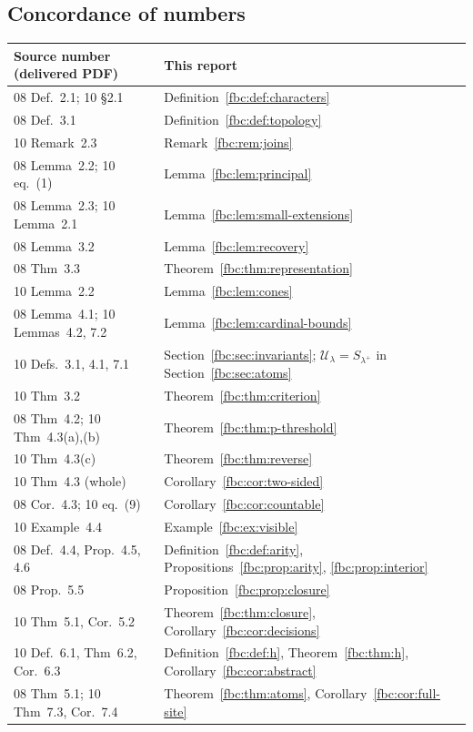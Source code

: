 \documentclass[11pt,letterpaper]{article}
\theoremstyle{definition}
\theoremstyle{remark}
\begin{document}
\subsection{Concordance of numbers}
\label{fbc:app:concordance}
\small
\begin{longtable}{@{}p{}p{}@{}}
\toprule
Source number (delivered PDF) & This report\\
\midrule
\endhead
08 Def.~2.1; 10 \S2.1 & Definition~\ref{fbc:def:characters}\\
08 Def.~3.1 & Definition~\ref{fbc:def:topology}\\
10 Remark~2.3 & Remark~\ref{fbc:rem:joins}\\
08 Lemma~2.2; 10 eq.~(1) & Lemma~\ref{fbc:lem:principal}\\
08 Lemma~2.3; 10 Lemma~2.1 & Lemma~\ref{fbc:lem:small-extensions}\\
08 Lemma~3.2 & Lemma~\ref{fbc:lem:recovery}\\
08 Thm~3.3 & Theorem~\ref{fbc:thm:representation}\\
10 Lemma~2.2 & Lemma~\ref{fbc:lem:cones}\\
08 Lemma~4.1; 10 Lemmas~4.2, 7.2 & Lemma~\ref{fbc:lem:cardinal-bounds}\\
10 Defs.~3.1, 4.1, 7.1 & Section~\ref{fbc:sec:invariants}; $\mathcal U_\lambda=S_{\lambda^+}$ in Section~\ref{fbc:sec:atoms}\\
10 Thm~3.2 & Theorem~\ref{fbc:thm:criterion}\\
08 Thm~4.2; 10 Thm~4.3(a),(b) & Theorem~\ref{fbc:thm:p-threshold}\\
10 Thm~4.3(c) & Theorem~\ref{fbc:thm:reverse}\\
10 Thm~4.3 (whole) & Corollary~\ref{fbc:cor:two-sided}\\
08 Cor.~4.3; 10 eq.~(9) & Corollary~\ref{fbc:cor:countable}\\
10 Example~4.4 & Example~\ref{fbc:ex:visible}\\
08 Def.~4.4, Prop.~4.5, 4.6 & Definition~\ref{fbc:def:arity}, Propositions~\ref{fbc:prop:arity}, \ref{fbc:prop:interior}\\
08 Prop.~5.5 & Proposition~\ref{fbc:prop:closure}\\
10 Thm~5.1, Cor.~5.2 & Theorem~\ref{fbc:thm:closure}, Corollary~\ref{fbc:cor:decisions}\\
10 Def.~6.1, Thm~6.2, Cor.~6.3 & Definition~\ref{fbc:def:h}, Theorem~\ref{fbc:thm:h}, Corollary~\ref{fbc:cor:abstract}\\
08 Thm~5.1; 10 Thm~7.3, Cor.~7.4 & Theorem~\ref{fbc:thm:atoms}, Corollary~\ref{fbc:cor:full-site}\\

\end{longtable}
\end{document}
